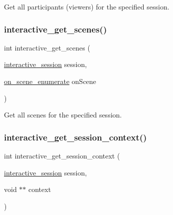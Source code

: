 Get all participants (viewers) for the specified session. 

\mbox{\label{group___interactivity_gad5a3d4eb33ce241ab8df4956cbc78f19}} 
\subsubsection{\texorpdfstring{interactive\+\_\+get\+\_\+scenes()}{interactive\_get\_scenes()}}
{\footnotesize\ttfamily int interactive\+\_\+get\+\_\+scenes (\begin{DoxyParamCaption}\item[{\mbox{\hyperlink{group___interactivity_ga6d8819d38b8dc8994a2299cf22a65a31}{interactive\+\_\+session}}}]{session,  }\item[{\mbox{\hyperlink{group___interactivity_ga4f096e039d6692c0be600cf0312540a0}{on\+\_\+scene\+\_\+enumerate}}}]{on\+Scene }\end{DoxyParamCaption})}



Get all scenes for the specified session. 

\mbox{\label{group___interactivity_ga915381698928c8d42e21874b5358f5b1}} 
\subsubsection{\texorpdfstring{interactive\+\_\+get\+\_\+session\+\_\+context()}{interactive\_get\_session\_context()}}
{\footnotesize\ttfamily int interactive\+\_\+get\+\_\+session\+\_\+context (\begin{DoxyParamCaption}\item[{\mbox{\hyperlink{group___interactivity_ga6d8819d38b8dc8994a2299cf22a65a31}{interactive\+\_\+session}}}]{session,  }\item[{void $\ast$$\ast$}]{context }\end{DoxyParamCaption})}



